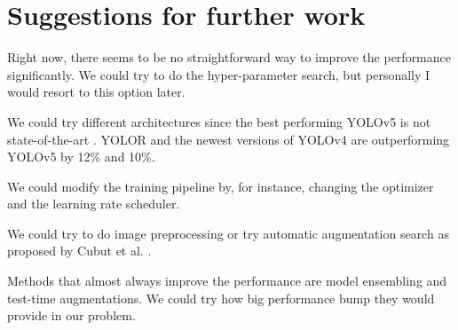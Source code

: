 \section{Suggestions for further work}
Right now, there seems to be no straightforward way to improve the performance significantly. We could try to do the hyper-parameter search, but personally I would resort to this option later.

We could try different architectures since the best performing YOLOv5 is not state-of-the-art \cite{paperwithcode}. YOLOR and the newest versions of YOLOv4 are outperforming YOLOv5 by 12\% and 10\%.

We could modify the training pipeline by, for instance, changing the optimizer and the learning rate scheduler.

We could try to do image preprocessing or try automatic augmentation search as proposed by Cubut et al. \cite{Cubuk2018}.

Methods that almost always improve the performance are model ensembling and test-time augmentations. We could try how big performance bump they would provide in our problem.
